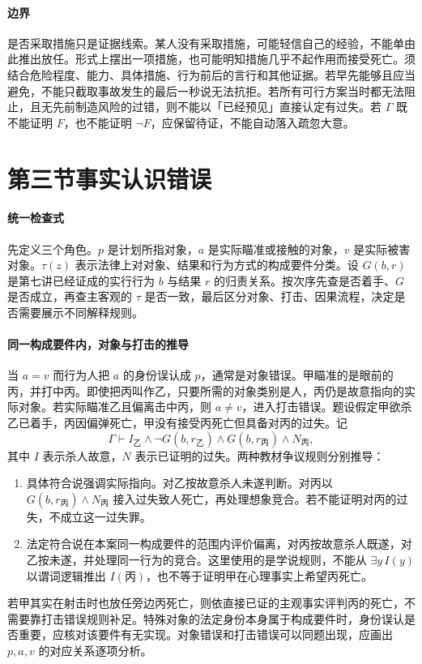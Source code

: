 \paragraph{边界}
是否采取措施只是证据线索。某人没有采取措施，可能轻信自己的经验，不能单由此推出放任。形式上摆出一项措施，也可能明知措施几乎不起作用而接受死亡。须结合危险程度、能力、具体措施、行为前后的言行和其他证据。若早先能够且应当避免，不能只截取事故发生的最后一秒说无法抗拒。若所有可行方案当时都无法阻止，且无先前制造风险的过错，则不能以「已经预见」直接认定有过失。若 $\Gamma$ 既不能证明 $F$，也不能证明 $\neg F$，应保留待证，不能自动落入疏忽大意。

\section{第三节\quad 事实认识错误}

\paragraph{统一检查式}
先定义三个角色。$p$ 是计划所指对象，$a$ 是实际瞄准或接触的对象，$v$ 是实际被害对象。$\tau(z)$ 表示法律上对对象、结果和行为方式的构成要件分类。设 $G(b,r)$ 是第七讲已经证成的实行行为 $b$ 与结果 $r$ 的归责关系。按次序先查是否着手、$G$ 是否成立，再查主客观的 $\tau$ 是否一致，最后区分对象、打击、因果流程，决定是否需要展示不同解释规则。

\paragraph{同一构成要件内，对象与打击的推导}
当 $a=v$ 而行为人把 $a$ 的身份误认成 $p$，通常是对象错误。甲瞄准的是眼前的丙，并打中丙。即使把丙叫作乙，只要所需的对象类别是人，丙仍是故意指向的实际对象。若实际瞄准乙且偏离击中丙，则 $a\ne v$，进入打击错误。题设假定甲欲杀乙已着手，丙因偏弹死亡，甲没有接受丙死亡但具备对丙的过失。记
\[
\Gamma\vdash I_{\text{乙}}\land\neg G(b,r_{\text{乙}})
               \land G(b,r_{\text{丙}})\land N_{\text{丙}},
\]
其中 $I$ 表示杀人故意，$N$ 表示已证明的过失。两种教材争议规则分别推导：
\begin{enumerate}
\item 具体符合说强调实际指向。对乙按故意杀人未遂判断。对丙以 $G(b,r_{\text{丙}})\land N_{\text{丙}}$ 接入过失致人死亡，再处理想象竞合。若不能证明对丙的过失，不成立这一过失罪。
\item 法定符合说在本案同一构成要件的范围内评价偏离，对丙按故意杀人既遂，对乙按未遂，并处理同一行为的竞合。这里使用的是学说规则，不能从 $\exists y\,I(y)$ 以谓词逻辑推出 $I(\text{丙})$，也不等于证明甲在心理事实上希望丙死亡。
\end{enumerate}
若甲其实在射击时也放任旁边丙死亡，则依直接已证的主观事实评判丙的死亡，不需要靠打击错误规则补足。特殊对象的法定身份本身属于构成要件时，身份误认是否重要，应核对该要件有无实现。对象错误和打击错误可以同题出现，应画出 $p,a,v$ 的对应关系逐项分析。

